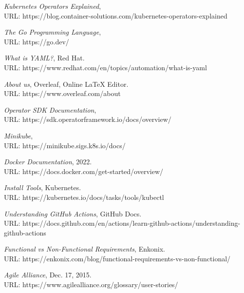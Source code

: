 \documentclass{article}
\begin{document}
\begin{thebibliography}{9}
\emph{Kubernetes Operators Explained}, \\URL: https://blog.container-solutions.com/kubernetes-operators-explained
  
\emph{The Go Programming Language}, \\URL: https://go.dev/

\emph{What is YAML?}, Red Hat. \\URL: https://www.redhat.com/en/topics/automation/what-is-yaml

\emph{About us}, Overleaf, Online LaTeX Editor. \\URL: https://www.overleaf.com/about 

\emph{Operator SDK Documentation},\\ URL: https://sdk.operatorframework.io/docs/overview/

\emph{Minikube}, \\URL: https://minikube.sigs.k8s.io/docs/

\emph{Docker Documentation}, 2022. \\URL: https://docs.docker.com/get-started/overview/
  
\emph{Install Tools}, Kubernetes. \\URL: https://kubernetes.io/docs/tasks/tools/kubectl

\emph{Understanding GitHub Actions}, GitHub Docs. \\URL: https://docs.github.com/en/actions/learn-github-actions/understanding-github-actions

\emph{Functional vs Non-Functional Requirements}, Enkonix. \\URL: https://enkonix.com/blog/functional-requirements-vs-non-functional/

\emph{Agile Alliance}, Dec. 17, 2015. \\URL: https://www.agilealliance.org/glossary/user-stories/
  


\end{thebibliography}

\clearpage
\end{document}
